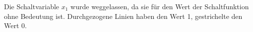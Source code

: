 \documentclass[a4paper,10pt]{scrartcl}
\begin{document}
\begin{enumerate}
\begin{enumerate}
                Die Schaltvariable $x_1$ wurde weggelassen, da sie für den Wert der Schaltfunktion ohne Bedeutung ist. Durchgezogene Linien
                haben den Wert 1, gestrichelte den Wert 0.

        \end{enumerate}
\end{enumerate}
\end{document}

